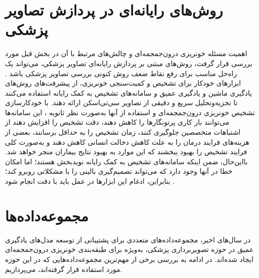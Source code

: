 \section{روش‌های رایانه‌ای در پردازش تصاویر پزشکی}
اهمیت مسئله خونریزی درون‌جمجمه‌ای و چالش‌های مرتبط با آن در بخش قبل مورد بررسی قرار گرفت، روش‌های مبتنی‌ بر پردازش رایانه‌ای
تصاویر پزشکی، می‌تواند یک راه‌حل مناسب برای رفع نقاط ضعف روش کنونی بررسی تصاویر پزشکی باشد
\cite{grewal2018radnet, arbabshirani2018advanced, ye2019precise, lee2019explainable, chang2018hybrid, chilamkurthy2018deep, titano2018automated, kuo2019expert}.
 ابزارهای خودکار برای تشخیص و کمیت‌سنجی خونریزی، از پیشرفت‌های روش‌های یادگیری ماشین 
و یادگیری عمیق
 و سامانه‌های
  تشخیص به کمک رایانه 
 استفاده می‌کنند تا تجزیه‌وتحلیل سریع و دقیقی از تصاویر سی‌تی‌اسکن ارائه دهند. با خودکارسازی تشخیص خونریزی درون‌جمجمه‌ای و استفاده از آنها به‌صورت نظر ثانویه
 ، این سامانه‌ها می‌توانند بار کاری پرتونگار‌ها را کاهش دهند، دقت تشخیص را افزایش دهند از اشتباهات متخصصین جلوگیری کنند، زمان تشخیص را به حداقل برسانند، بعضی از هزینه‌های فرایند درمان را به علت کاهش دخالت انسانی کاهش دهند و به‌صورت کلی فرایند تشخیص را بهبود ببخشند که این موارد به بهبود نتایج بیماران منجر خواهد شد. بااین‌حال، ضمن اینکه سامانه‌های تشخیص به کمک رایانه نویدبخش هستند؛ اما امکان خطا در آنها وجود دارد که می‌تواند تصمیم‌گیری بالینی را با مشکلاتی روبرو کند؛ بنابراین، ادغام این ابزارها در عمل باید با دقت انجام شود \cite{titano2018automated}.
 
 
 
 \section{مجموعه‌داده‌ها}
 
 
 در سال‌های اخیر، مجموعه‌داده‌های متعددی برای پشتیبانی از توسعه مدل‌های یادگیری عمیق در حوزه تصویربرداری پزشکی، به‌ویژه برای طبقه‌بندی خونریزی درون‌جمجمه‌ای ایجاد شده‌اند. در ادامه به بررسی برخی از مهم‌ترین مجموعه‌داده‌هایی که در این حوزه مورد استفاده قرار گرفته‌اند، می‌پردازیم.
 
